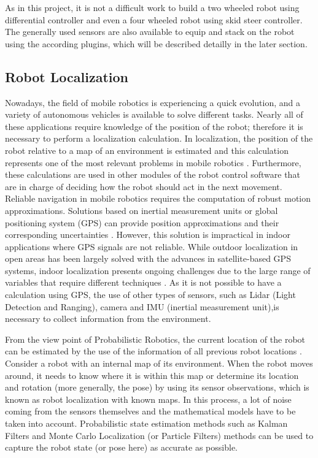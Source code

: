 \documentclass[10pt,journal,compsoc]{IEEEtran}
\begin{document}
As in this project, it is not a difficult work to build a two wheeled robot using differential controller and even a four wheeled robot using skid steer controller. The generally used sensors are also available to equip and stack on the robot using the according plugins, which will be described detailly in the later section.

\subsection{Robot Localization}
Nowadays, the field of mobile robotics is experiencing a quick evolution, and a variety of autonomous vehicles is available to solve different tasks. Nearly all of these applications require knowledge of the position of the robot; therefore it is necessary to perform a localization calculation. In localization, the position of the robot relative to a map of an environment is estimated and this calculation represents one of the most relevant problems in mobile robotics \cite{monte-carlo-localization-view}. Furthermore, these calculations are used in other modules of the robot control software that are in charge of deciding how the robot should act in the next movement. Reliable navigation in mobile robotics requires the computation of robust motion approximations. Solutions based on inertial measurement units or global positioning system (GPS) can provide position approximations and their corresponding uncertainties \cite{field-robot-localization}. However, this solution is impractical in indoor applications where GPS signals are not reliable. While outdoor localization in open areas has been largely solved with the advances in satellite-based GPS systems, indoor localization presents ongoing challenges due to the large range of variables that require different techniques \cite{indoor-localization-solution}. As it is not possible to have a calculation using GPS, the use of other types of sensors, such as Lidar (Light Detection and Ranging), camera and IMU (inertial measurement unit),is necessary to collect information from the environment. 

From the view point of Probabilistic Robotics, the current location of the robot can be estimated by the use of the information of all previous robot locations \cite{probabilistic-robotics}. Consider a robot with an internal map of its environment. When the robot moves around, it needs to know where it is within this map or determine its location and rotation (more generally, the pose) by using its sensor observations, which is known as robot localization with known maps. In this process, a lot of noise coming from the sensors themselves and the mathematical models have to be taken into account. Probabilistic state estimation methods such as Kalman Filters \cite{kalman-filter-intro} and Monte Carlo Localization (or Particle Filters) \cite{mcl-intro} methods can be used to capture the robot state (or pose here) as accurate as possible.
\end{document}
